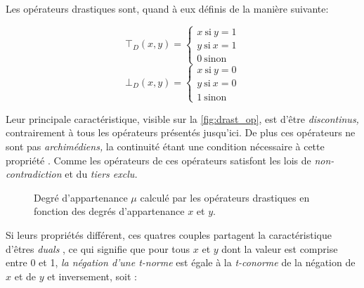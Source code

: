 Les opérateurs drastiques sont, quand à eux définis de la manière
suivante:

\begin{equation}
  \label{eq:norm_drast}
  ⊤_D(x,y)  = \left \{
    \begin{array}{ll}
      x\ \text{si}\ y=1\\
      y\ \text{si}\ x=1\\
      0\ \text{sinon}
    \end{array}
  \right.
\end{equation}
%
\begin{equation}
  \label{eq:conorm_drast}
  ⊥_D(x,y)  = \left \{
    \begin{array}{ll}
      x\ \text{si}\ y=0\\
      y\ \text{si}\ x=0\\
      1\ \text{sinon}
    \end{array}
  \right.
\end{equation}

Leur principale caractéristique, visible sur la
\autoref{fig:drast_op}, est d'être \emph{discontinus,} contrairement à
tous les opérateurs présentés jusqu'ici. De plus ces opérateurs ne
sont pas \emph{archimédiens,} la continuité étant une condition
nécessaire à cette propriété \autocite{Bouchon-Meunier1995}. Comme les
opérateurs de  ces opérateurs satisfont les lois de
\emph{non-contradiction} et du \emph{tiers exclu.}

\begin{figure}
  \begin{center}
     \hfill
    \caption{Degré d'appartenance \(\mu\) calculé par les opérateurs
      drastiques en fonction des degrés d'appartenance \(x\) et
      \(y\).}
    \label{fig:drast_op}
  \end{center}
\end{figure}

Si leurs propriétés différent, ces quatres couples partagent la
caractéristique d'êtres \emph{duals} \autocite{Bouchon-Meunier2007},
ce qui signifie que pour tous \(x\) et \(y\) dont la valeur est
comprise entre 0 et 1, \emph{la négation d'une \emph{t-norme}} est
égale à la \emph{t-conorme} de la négation de \(x\) et de \(y\) et
inversement, soit :

